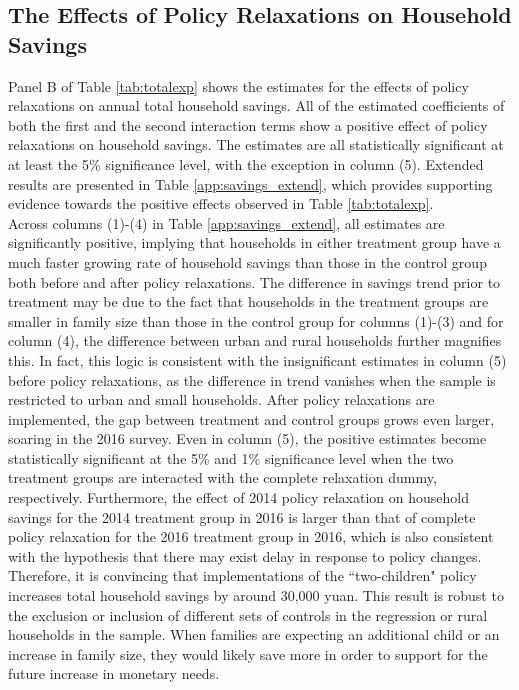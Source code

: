 \documentclass[12pt]{extarticle}
\begin{document}
\subsection{The Effects of Policy Relaxations on Household Savings}
Panel B of Table \ref{tab:totalexp} shows the estimates for the effects of policy relaxations on annual total household savings. All of the estimated coefficients of both the first and the second interaction terms show a positive effect of policy relaxations on household savings. The estimates are all statistically significant at at least the 5\% significance level, with the exception in column (5). Extended results are presented in Table \ref{app:savings_extend}, which provides supporting evidence towards the positive effects observed in Table \ref{tab:totalexp}. \\
\indent Across columns (1)-(4) in Table \ref{app:savings_extend}, all estimates are significantly positive, implying that households in either treatment group have a much faster growing rate of household savings than those in the control group both before and after policy relaxations. The difference in savings trend prior to treatment may be due to the fact that households in the treatment groups are smaller in family size than those in the control group for columns (1)-(3) and for column (4), the difference between urban and rural households further magnifies this. In fact, this logic is consistent with the insignificant estimates in column (5) before policy relaxations, as the difference in trend vanishes when the sample is restricted to urban and small households. After policy relaxations are implemented, the gap between treatment and control groups grows even larger, soaring in the 2016 survey. Even in column (5), the positive estimates become statistically significant at the 5\% and 1\% significance level when the two treatment groups are interacted with the complete relaxation dummy, respectively. Furthermore, the effect of 2014 policy relaxation on household savings for the 2014 treatment group in 2016 is larger than that of complete policy relaxation for the 2016 treatment group in 2016, which is also consistent with the hypothesis that there may exist delay in response to policy changes. \\
\indent Therefore, it is convincing that implementations of the ``two-children" policy increases total household savings by around 30,000 yuan. This result is robust to the exclusion or inclusion of different sets of controls in the regression or rural households in the sample. When families are expecting an additional child or an increase in family size, they would likely save more in order to support for the future increase in monetary needs.
\end{document}

